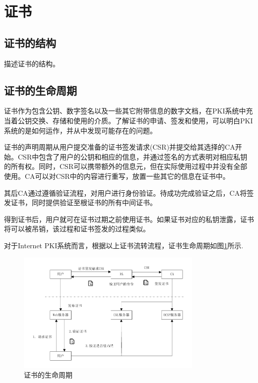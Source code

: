\section{证书}

\subsection{证书的结构}

描述证书的结构。

\subsection{证书的生命周期}


证书作为包含公钥、数字签名以及一些其它附带信息的数字文档，在PKI系统中充当着公钥交换、存储和使用的介质。了解证书的申请、签发和使用，可以明白PKI系统的是如何运作，并从中发现可能存在的问题。

证书的声明周期从用户提交准备的证书签发请求(CSR)并提交给其选择的CA开始。CSR中包含了用户的公钥和相应的信息，并通过签名的方式表明对相应私钥的所有权。同时，CSR可以携带额外的信息元，但在实际使用过程中并没有全部使用。CA可以对CSR中的内容进行重写，放置一些其它的信息在证书中。

其后CA通过遵循验证流程，对用户进行身份验证。待成功完成验证之后，CA将签发证书，同时提供验证至根证书的所有中间证书。

得到证书后，用户就可在证书过期之前使用证书。如果证书对应的私钥泄露，证书将可以被吊销，该过程和证书签发的过程类似。

对于Internet PKI系统而言，根据以上证书流转流程，证书生命周期如图\ref{fig:cert_lifecycle}所示.

\begin{figure}[htbp]
 	\centering
 	\includegraphics[width = 0.8\textwidth]{img/cert_lifecycle}
 	\caption{证书的生命周期}\label{fig:cert_lifecycle}
\end{figure}

